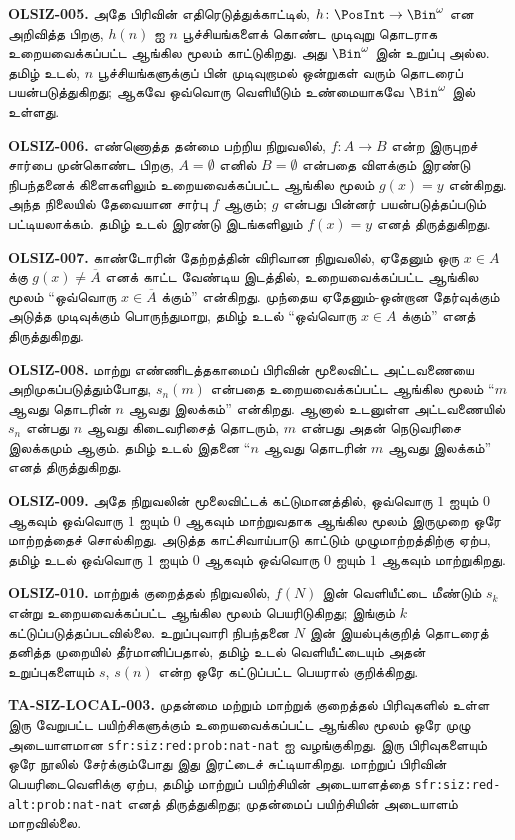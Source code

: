 \textbf{OLSIZ-005.} அதே பிரிவின் எதிரெடுத்துக்காட்டில்,
$h\colon\PosInt\to\Bin^\omega$ என அறிவித்த பிறகு, $h(n)$ ஐ
$n$ பூச்சியங்களைக் கொண்ட முடிவுறு தொடராக உறையவைக்கப்பட்ட ஆங்கில மூலம்
காட்டுகிறது. அது $\Bin^\omega$ இன் உறுப்பு அல்ல. தமிழ் உடல்,
$n$ பூச்சியங்களுக்குப் பின் முடிவுறாமல் ஒன்றுகள் வரும் தொடரைப்
பயன்படுத்துகிறது; ஆகவே ஒவ்வொரு வெளியீடும் உண்மையாகவே
$\Bin^\omega$ இல் உள்ளது.

\textbf{OLSIZ-006.} எண்ணொத்த தன்மை பற்றிய நிறுவலில்,
$f\colon A\to B$ என்ற இருபுறச் சார்பை முன்கொண்ட பிறகு,
$A=\emptyset$ எனில் $B=\emptyset$ என்பதை விளக்கும் இரண்டு
நிபந்தனைக் கிளைகளிலும் உறையவைக்கப்பட்ட ஆங்கில மூலம்
$g(x)=y$ என்கிறது. அந்த நிலையில் தேவையான சார்பு $f$ ஆகும்;
$g$ என்பது பின்னர் பயன்படுத்தப்படும் பட்டியலாக்கம்.
தமிழ் உடல் இரண்டு இடங்களிலும் $f(x)=y$ எனத் திருத்துகிறது.

\textbf{OLSIZ-007.} காண்டோரின் தேற்றத்தின் விரிவான நிறுவலில்,
ஏதேனும் ஒரு $x\in A$ க்கு $g(x)\ne\overline A$ எனக்
காட்ட வேண்டிய இடத்தில், உறையவைக்கப்பட்ட ஆங்கில மூலம்
“ஒவ்வொரு $x\in\overline A$ க்கும்” என்கிறது.
முந்தைய ஏதேனும்-ஒன்றான தேர்வுக்கும் அடுத்த முடிவுக்கும் பொருந்துமாறு,
தமிழ் உடல் “ஒவ்வொரு $x\in A$ க்கும்” எனத் திருத்துகிறது.

\textbf{OLSIZ-008.} மாற்று எண்ணிடத்தகாமைப் பிரிவின் மூலைவிட்ட
அட்டவணையை அறிமுகப்படுத்தும்போது, $s_n(m)$ என்பதை உறையவைக்கப்பட்ட
ஆங்கில மூலம் “$m$ ஆவது தொடரின் $n$ ஆவது இலக்கம்” என்கிறது.
ஆனால் உடனுள்ள அட்டவணையில் $s_n$ என்பது $n$ ஆவது கிடைவரிசைத் தொடரும்,
$m$ என்பது அதன் நெடுவரிசை இலக்கமும் ஆகும்.
தமிழ் உடல் இதனை “$n$ ஆவது தொடரின் $m$ ஆவது இலக்கம்” எனத் திருத்துகிறது.

\textbf{OLSIZ-009.} அதே நிறுவலின் மூலைவிட்டக் கட்டுமானத்தில்,
ஒவ்வொரு $1$ ஐயும் $0$ ஆகவும் ஒவ்வொரு $1$ ஐயும் $0$ ஆகவும்
மாற்றுவதாக ஆங்கில மூலம் இருமுறை ஒரே மாற்றத்தைச் சொல்கிறது.
அடுத்த காட்சிவாய்பாடு காட்டும் முழுமாற்றத்திற்கு ஏற்ப,
தமிழ் உடல் ஒவ்வொரு $1$ ஐயும் $0$ ஆகவும் ஒவ்வொரு $0$ ஐயும்
$1$ ஆகவும் மாற்றுகிறது.

\textbf{OLSIZ-010.} மாற்றுக் குறைத்தல் நிறுவலில்,
$f(N)$ இன் வெளியீட்டை மீண்டும் $s_k$ என்று உறையவைக்கப்பட்ட ஆங்கில
மூலம் பெயரிடுகிறது; இங்கும் $k$ கட்டுப்படுத்தப்படவில்லை.
உறுப்புவாரி நிபந்தனை $N$ இன் இயல்புக்குறித் தொடரைத் தனித்த முறையில்
தீர்மானிப்பதால், தமிழ் உடல் வெளியீட்டையும் அதன் உறுப்புகளையும்
$s$, $s(n)$ என்ற ஒரே கட்டுப்பட்ட பெயரால் குறிக்கிறது.

\textbf{TA-SIZ-LOCAL-003.} முதன்மை மற்றும் மாற்றுக் குறைத்தல்
பிரிவுகளில் உள்ள இரு வேறுபட்ட பயிற்சிகளுக்கும் உறையவைக்கப்பட்ட ஆங்கில
மூலம் ஒரே முழு அடையாளமான
\texttt{sfr:siz:red:prob:nat-nat} ஐ வழங்குகிறது. இரு பிரிவுகளையும்
ஒரே நூலில் சேர்க்கும்போது இது இரட்டைச் சுட்டியாகிறது.
மாற்றுப் பிரிவின் பெயரிடைவெளிக்கு ஏற்ப, தமிழ் மாற்றுப் பயிற்சியின்
அடையாளத்தை \texttt{sfr:siz:red-alt:prob:nat-nat} எனத் திருத்துகிறது;
முதன்மைப் பயிற்சியின் அடையாளம் மாறவில்லை.
